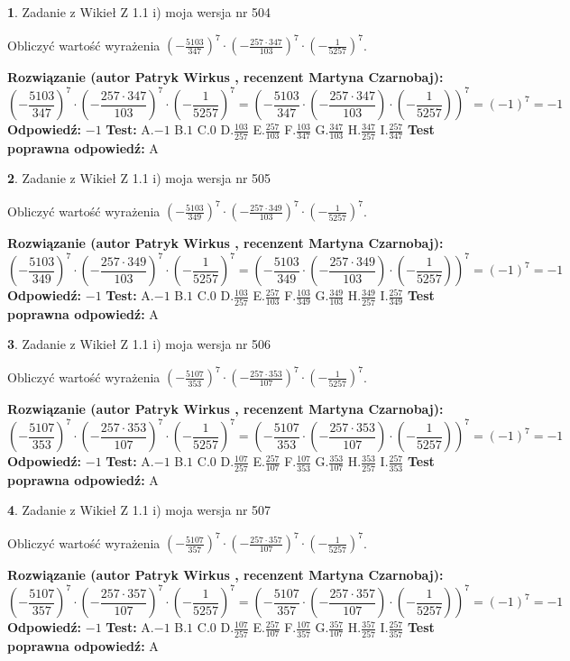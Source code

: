 \documentclass[12pt, a4paper]{article}
\theoremstyle{definition} %
\newtheorem{zad}{}
\newcommand{\zadStart}[1]{\begin{zad}#1\newline}
\newcommand{\zadStop}{\end{zad}}
\newcommand{\rozwStart}[2]{\noindent \textbf{Rozwiązanie (autor #1 , recenzent #2): }\newline}
\newcommand{\rozwStop}{\newline}
\newcommand{\odpStart}{\noindent \textbf{Odpowiedź:}\newline}
\newcommand{\odpStop}{\newline}
\newcommand{\testStart}{\noindent \textbf{Test:}\newline}
\newcommand{\testStop}{\newline}
\newcommand{\kluczStart}{\noindent \textbf{Test poprawna odpowiedź:}\newline}
\newcommand{\kluczStop}{\newline}
\begin{document}
\zadStart{Zadanie z Wikieł Z 1.1 i) moja wersja nr 504}

Obliczyć wartość wyrażenia $(-\frac{5103}{347})^{7} \cdot (-\frac{257 \cdot 347}{103})^{7} \cdot (-\frac{1}{5257})^{7}$.
\zadStop
\rozwStart{Patryk Wirkus}{Martyna Czarnobaj}
$$(-\frac{5103}{347})^{7} \cdot (-\frac{257 \cdot 347}{103})^{7} \cdot (-\frac{1}{5257})^{7} = (-\frac{5103}{347} \cdot (-\frac{257 \cdot 347}{103}) \cdot (-\frac{1}{5257}))^{7} = (-1)^{7} = -1$$
\rozwStop
\odpStart
$-1$
\odpStop
\testStart
A.$-1$ B.$1$ C.$0$ D.$\frac{103}{257}$ E.$\frac{257}{103}$
F.$\frac{103}{347}$ G.$\frac{347}{103}$
H.$\frac{347}{257}$
I.$\frac{257}{347}$
\testStop
\kluczStart
A
\kluczStop



\zadStart{Zadanie z Wikieł Z 1.1 i) moja wersja nr 505}

Obliczyć wartość wyrażenia $(-\frac{5103}{349})^{7} \cdot (-\frac{257 \cdot 349}{103})^{7} \cdot (-\frac{1}{5257})^{7}$.
\zadStop
\rozwStart{Patryk Wirkus}{Martyna Czarnobaj}
$$(-\frac{5103}{349})^{7} \cdot (-\frac{257 \cdot 349}{103})^{7} \cdot (-\frac{1}{5257})^{7} = (-\frac{5103}{349} \cdot (-\frac{257 \cdot 349}{103}) \cdot (-\frac{1}{5257}))^{7} = (-1)^{7} = -1$$
\rozwStop
\odpStart
$-1$
\odpStop
\testStart
A.$-1$ B.$1$ C.$0$ D.$\frac{103}{257}$ E.$\frac{257}{103}$
F.$\frac{103}{349}$ G.$\frac{349}{103}$
H.$\frac{349}{257}$
I.$\frac{257}{349}$
\testStop
\kluczStart
A
\kluczStop



\zadStart{Zadanie z Wikieł Z 1.1 i) moja wersja nr 506}

Obliczyć wartość wyrażenia $(-\frac{5107}{353})^{7} \cdot (-\frac{257 \cdot 353}{107})^{7} \cdot (-\frac{1}{5257})^{7}$.
\zadStop
\rozwStart{Patryk Wirkus}{Martyna Czarnobaj}
$$(-\frac{5107}{353})^{7} \cdot (-\frac{257 \cdot 353}{107})^{7} \cdot (-\frac{1}{5257})^{7} = (-\frac{5107}{353} \cdot (-\frac{257 \cdot 353}{107}) \cdot (-\frac{1}{5257}))^{7} = (-1)^{7} = -1$$
\rozwStop
\odpStart
$-1$
\odpStop
\testStart
A.$-1$ B.$1$ C.$0$ D.$\frac{107}{257}$ E.$\frac{257}{107}$
F.$\frac{107}{353}$ G.$\frac{353}{107}$
H.$\frac{353}{257}$
I.$\frac{257}{353}$
\testStop
\kluczStart
A
\kluczStop



\zadStart{Zadanie z Wikieł Z 1.1 i) moja wersja nr 507}

Obliczyć wartość wyrażenia $(-\frac{5107}{357})^{7} \cdot (-\frac{257 \cdot 357}{107})^{7} \cdot (-\frac{1}{5257})^{7}$.
\zadStop
\rozwStart{Patryk Wirkus}{Martyna Czarnobaj}
$$(-\frac{5107}{357})^{7} \cdot (-\frac{257 \cdot 357}{107})^{7} \cdot (-\frac{1}{5257})^{7} = (-\frac{5107}{357} \cdot (-\frac{257 \cdot 357}{107}) \cdot (-\frac{1}{5257}))^{7} = (-1)^{7} = -1$$
\rozwStop
\odpStart
$-1$
\odpStop
\testStart
A.$-1$ B.$1$ C.$0$ D.$\frac{107}{257}$ E.$\frac{257}{107}$
F.$\frac{107}{357}$ G.$\frac{357}{107}$
H.$\frac{357}{257}$
I.$\frac{257}{357}$
\testStop
\kluczStart
A
\kluczStop
\end{document}
